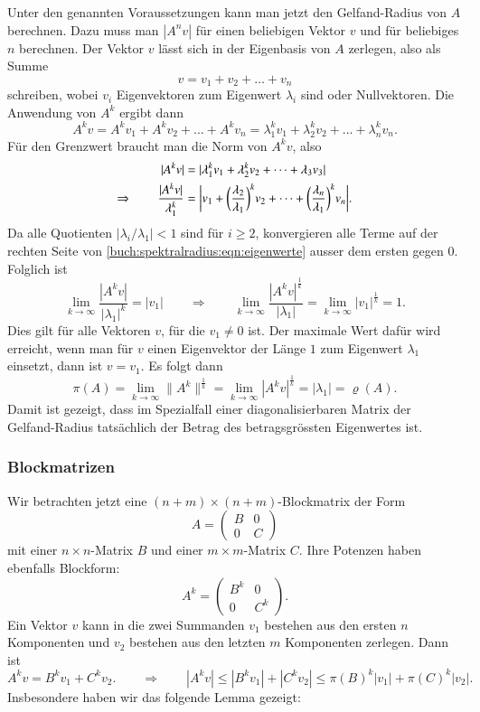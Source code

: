 Unter den genannten Voraussetzungen kann man jetzt den Gelfand-Radius
von $A$ berechnen.
Dazu muss man $|A^nv|$ für einen beliebigen Vektor $v$ und für
beliebiges $n$ berechnen.
Der Vektor $v$ lässt sich in der Eigenbasis von $A$ zerlegen, also
als Summe
%
\[
v = v_1+v_2+\dots+v_n
\]
schreiben, wobei $v_i$ Eigenvektoren zum Eigenwert $\lambda_i$ sind oder
Nullvektoren.
Die Anwendung von $A^k$ ergibt dann
\[
A^k v
=
A^k v_1 + A^k v_2 + \dots + A^k v_n
=
\lambda_1^k v_1 + \lambda_2^k v_2 + \dots + \lambda_n^k v_n.
\]
Für den Grenzwert braucht man die Norm von $A^kv$, also
\begin{align}
|A^kv|
&= |\lambda_1^k v_1 + \lambda_2^k v_2 + \dots + \lambda_3 v_3|
\notag
\\
\Rightarrow\qquad
\frac{|A^kv|}{\lambda_1^k}
&=
\biggl|
v_1 +
\biggl(\frac{\lambda_2}{\lambda_1}\biggr)^k v_2
+
\dots
+
\biggl(\frac{\lambda_n}{\lambda_1}\biggr)^k v_n
\biggr|.
\label{buch:spektralradius:eqn:eigenwerte}
\end{align}
Da alle Quotienten $|\lambda_i/\lambda_1|<1$ sind für $i\ge 2$,
konvergieren alle Terme auf der rechten Seite von
\eqref{buch:spektralradius:eqn:eigenwerte}
ausser dem ersten gegen $0$.
Folglich ist
\[
\lim_{k\to\infty} \frac{|A^kv|}{|\lambda_1|^k}
=
|v_1|
\qquad\Rightarrow\qquad
\lim_{k\to\infty} \frac{|A^kv|^\frac1k}{|\lambda_1|}
=
\lim_{k\to\infty}|v_1|^{\frac1k}
=
1.
\]
Dies gilt für alle Vektoren $v$, für die $v_1\ne 0$ ist.
Der maximale Wert dafür wird erreicht, wenn man für 
$v$ einen Eigenvektor der Länge $1$ zum Eigenwert $\lambda_1$ einsetzt,
dann ist $v=v_1$.
Es folgt dann
\[
\pi(A)
=
\lim_{k\to\infty} \| A^k\|^\frac1k
=
\lim_{k\to\infty} |A^kv|^\frac1k
=
|\lambda_1|
=
\varrho(A).
\]
Damit ist gezeigt, dass im Spezialfall einer diagonalisierbaren Matrix der
Gelfand-Radius tatsächlich der Betrag des betragsgrössten Eigenwertes ist.
%

\subsubsection{Blockmatrizen}
Wir betrachten jetzt eine $(n+m)\times(n+m)$-Blockmatrix der Form
\begin{equation}
A = \begin{pmatrix} B & 0 \\ 0 & C\end{pmatrix}
\label{buch:spektralradius:eqn:blockmatrix}
\end{equation}
mit einer $n\times n$-Matrix $B$ und einer $m\times m$-Matrix $C$.
Ihre Potenzen haben ebenfalls Blockform:
\[
A^k = \begin{pmatrix} B^k & 0 \\ 0 & C^k\end{pmatrix}.
\]
Ein Vektor $v$ kann in die zwei Summanden $v_1$ bestehen aus den
ersten $n$ Komponenten und $v_2$ bestehen aus den letzten $m$ 
Komponenten zerlegen.
Dann ist
\[
A^kv = B^kv_1 + C^kv_2.
\qquad\Rightarrow\qquad
|A^kv|
\le
|B^kv_1| + |C^kv_2|
\le 
\pi(B)^k |v_1| + \pi(C)^k |v_2|.
\]
Insbesondere haben wir das folgende Lemma gezeigt:

